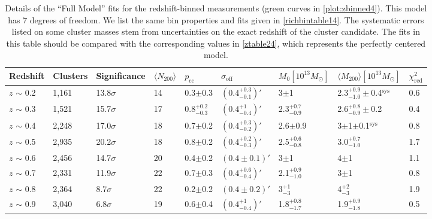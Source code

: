 \begin{landscape}
\begin{table}
\centering
    \caption[Shear Results for Redshift-Binned Clusters (Full Model)]{Details of the ``Full Model'' fits for the redshift-binned measurements (green curves in \autoref{plot:zbinned4}). This model has 7 degrees of freedom. We list the same bin properties and fits given in \autoref{richbintable14}. The systematic errors listed on some cluster masses stem from uncertainties on the exact redshift of the cluster candidate. The fits in this table should be compared with the corresponding values in \autoref{ztable24}, which represents the perfectly centered model.}
    \begin{tabular}{lllllllll}
      \hline
      Redshift & Clusters & Significance & $\langle N_{200} \rangle$ & $p_{\mathrm{cc}}$ & $\sigma_{\mathrm{off}}$ & $M_0 \left[ 10^{13} M_{\odot}\right]$ & $\langle M_{200} \rangle \left[ 10^{13} M_{\odot}\right]$ & $\chi^2_{\mathrm{red}}$ \\ \hline
      $z$ $\sim$ 0.2 & 1,161 & 13.8$\sigma$ & 14 & 0.3$\pm$0.3 & $(0.4^{+0.3}_{-0.1})'$ & 3$\pm$1 & 2.3$^{+0.9}_{-1.0}\pm$0.4$^{\mathrm{sys}}$ & 0.6 \\
      $z$ $\sim$ 0.3 & 1,521 & 15.7$\sigma$ & 17 & 0.8$^{+0.2}_{-0.3}$ & $(0.4^{+1}_{-0.4})'$ & 2.3$^{+0.7}_{-0.9}$ & 2.6$^{+0.8}_{-0.9}\pm$0.2 & 0.4 \\
      $z$ $\sim$ 0.4 & 2,248 & 17.0$\sigma$ & 18 & 0.7$\pm$0.2 & $(0.4^{+0.3}_{-0.2})'$ & 2.6$\pm$0.9 & 3$\pm$1$\pm$0.1$^{\mathrm{sys}}$ & 0.8 \\
      $z$ $\sim$ 0.5 & 2,935 & 20.2$\sigma$ & 18 & 0.8$\pm$0.2 & $(0.4^{+0.2}_{-0.3})'$ & 2.5$^{+0.6}_{-0.8}$ & 3.0$^{+0.7}_{-1.0}$ & 1.7 \\
      $z$ $\sim$ 0.6 & 2,456 & 14.7$\sigma$ & 20 & 0.4$\pm$0.2 & $(0.4\pm0.1)'$ & 3$\pm$1 & 4$\pm$1 & 1.1 \\
      $z$ $\sim$ 0.7 & 2,331 & 11.9$\sigma$ & 22 & 0.7$\pm$0.3 & $(0.4^{+0.6}_{-0.4})'$ & 2.1$^{+0.9}_{-1.0}$ & 3$\pm$1 & 0.8 \\
      $z$ $\sim$ 0.8 & 2,364 & 8.7$\sigma$ & 22 & 0.2$\pm$0.2 & $(0.4\pm0.2)'$ & 3$^{+1}_{-3}$ & 4$^{+2}_{-3}$ & 1.9 \\ 
      $z$ $\sim$ 0.9 & 3,040 & 6.8$\sigma$ & 19 & 0.6$\pm$0.4 & $(0.4^{+1}_{-0.4})'$ & 1.8$^{+0.8}_{-1.7}$ & 1.9$^{+0.9}_{-1.8}$ & 0.5 \\
      \hline
    \end{tabular}
    \label{ztable14}
\end{table}


\end{landscape}
